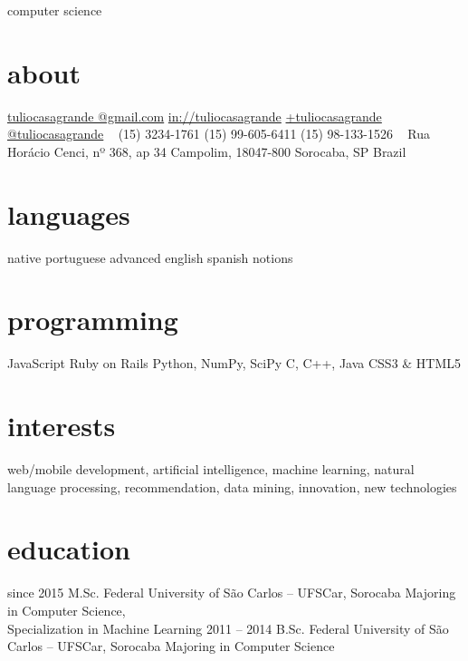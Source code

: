 \documentclass[]{friggeri-cv}
\begin{document}
       {computer science}


\begin{aside}
  \section{about}
    \href{mailto:tuliocasagrande@gmail.com}{tuliocasagrande @gmail.com}
    \href{http://www.linkedin.com/in/tuliocasagrande}{in://tuliocasagrande}
    \href{https://plus.google.com/+tuliocasagrande}{+tuliocasagrande}
    \href{https://twitter.com/tuliocasagrande}{@tuliocasagrande}
    ~
    (15) 3234-1761
    (15) 99-605-6411
    (15) 98-133-1526
    ~
    Rua Horácio Cenci,
    nº 368, ap 34
    Campolim, 18047-800
    Sorocaba, SP
    Brazil
  \section{languages}
    native portuguese
    advanced english
    spanish notions
  \section{programming}
    JavaScript
    Ruby on Rails
    Python, NumPy, SciPy
    C, C++, Java
    CSS3 \& HTML5
\end{aside}

\section{interests}

web/mobile development, artificial intelligence, machine learning, natural language processing, recommendation, data mining, innovation, new technologies

\section{education}

\begin{entrylist}
  \entry
    {since 2015}
    {M.Sc.}
    {Federal University of São Carlos -- UFSCar, Sorocaba}
    {Majoring in Computer Science,\\
    Specialization in Machine Learning}
  \entry
    {2011 – 2014}
    {B.Sc.}
    {Federal University of São Carlos -- UFSCar, Sorocaba}
    {Majoring in Computer Science}
\end{entrylist}
\end{document}
